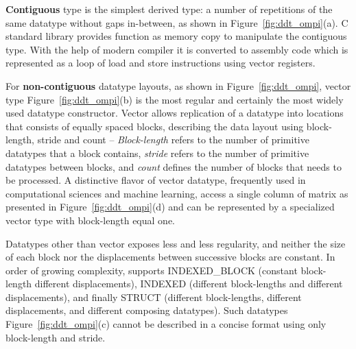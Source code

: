 \documentclass[conference]{IEEEtran}
\begin{document}
{\bf Contiguous} type is the simplest derived type: a number of repetitions of
the same datatype without gaps in-between, as shown in Figure~\ref{fig:ddt_ompi}(a).
C standard library provides function as memory copy to manipulate the contiguous type.
With the help of modern compiler it is converted to assembly code
which is represented as a loop of load and store instructions using vector registers.

For {\bf non-contiguous} datatype layouts, as shown in Figure~\ref{fig:ddt_ompi},
vector type Figure~\ref{fig:ddt_ompi}(b) is the most regular and certainly the
most widely used \mpi datatype constructor. Vector allows replication of a
datatype into locations that consists of equally spaced blocks, describing the
data layout using block-length, stride and count -- \emph{Block-length} refers
to the number of primitive datatypes that a block contains, \emph{stride} refers
to the number of primitive datatypes between blocks, and \emph{count} defines the
number of blocks that needs to be processed.
%
A distinctive flavor of vector datatype, frequently used in computational sciences
and machine learning, access a single column of matrix as presented in
Figure~\ref{fig:ddt_ompi}(d) and can be represented by a specialized vector type
with block-length equal one.

Datatypes other than vector exposes less and less regularity, and neither the
size of each block nor the displacements between successive blocks are constant.
In order of growing complexity, \mpi supports INDEXED\_BLOCK (constant
block-length different displacements), INDEXED (different block-lengths and
different displacements), and finally STRUCT (different block-lengths, different
displacements, and different composing datatypes). Such datatypes
Figure~\ref{fig:ddt_ompi}(c) cannot be described in a concise format using only
block-length and stride.
\end{document}

